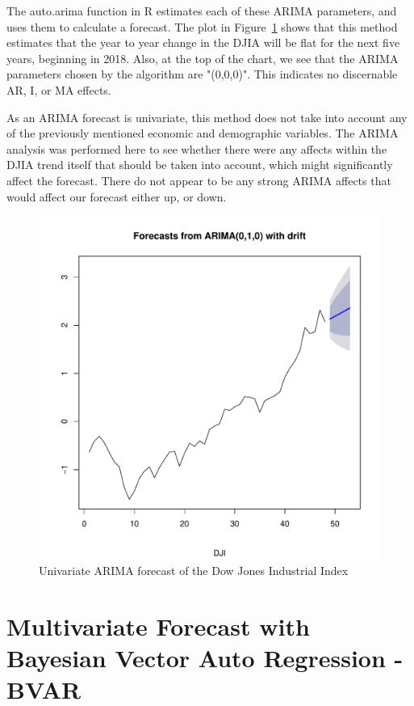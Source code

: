 \documentclass[12pt]{article}         %
\begin{document}
The auto.arima function in R estimates each of these ARIMA parameters, and uses them to calculate a forecast.  The plot in Figure~\ref{fig:ArimaDJI} shows that this method estimates that the year to year change in the DJIA will be flat for the next five years, beginning in 2018.  Also, at the top of the chart, we see that the ARIMA parameters chosen by the algorithm are "(0,0,0)".  This indicates no discernable AR, I, or MA effects. 

As an ARIMA forecast is univariate, this method does not take into account any of the previously mentioned economic and demographic variables.  The ARIMA analysis was performed here to see whether there were any affects within the DJIA trend itself that should be taken into account, which might significantly affect the forecast.  There do not appear to be any strong ARIMA affects that would affect our forecast either up, or down.

\begin{figure}[h!]
\begin{center}
\includegraphics[width=\linewidth]{plots/DJI_arima.pdf}
\caption{Univariate ARIMA forecast of the Dow Jones Industrial Index}
\label{fig:ArimaDJI}
\end{center}
\end{figure}


\section{Multivariate Forecast with Bayesian Vector Auto Regression - BVAR}
\end{document}
